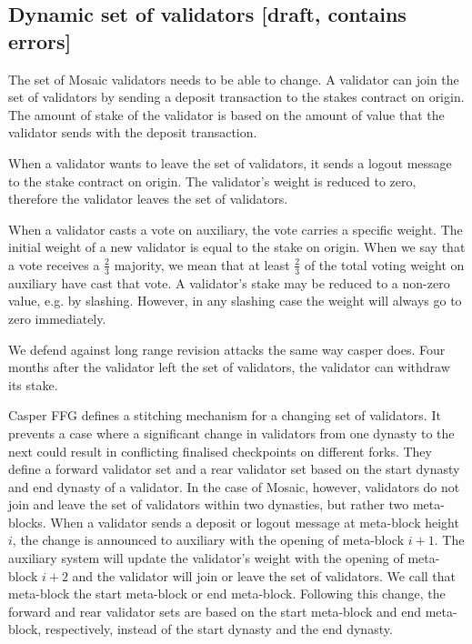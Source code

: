 \documentclass[12pt,a4paper]{article}
\begin{document}
\subsection{Dynamic set of validators [draft, contains errors]}

The set of Mosaic validators needs to be able to change.
A validator can join the set of validators by sending a deposit transaction to the stakes contract on origin.
The amount of stake of the validator is based on the amount of value that the validator sends with the deposit transaction.

When a validator wants to leave the set of validators, it sends a logout message to the stake contract on origin.
The validator's weight is reduced to zero, therefore the validator leaves the set of validators.

When a validator casts a vote on auxiliary, the vote carries a specific weight.
The initial weight of a new validator is equal to the stake on origin.
When we say that a vote receives a $\frac{2}{3}$ majority, we mean that at least $\frac{2}{3}$ of the total voting weight on auxiliary have cast that vote.
A validator's stake may be reduced to a non-zero value, e.g. by slashing.
However, in any slashing case the weight will always go to zero immediately.

We defend against long range revision attacks the same way casper does.
Four months after the validator left the set of validators, the validator can withdraw its stake.

Casper FFG\cite{casperffg} defines a stitching mechanism for a changing set of validators.
It prevents a case where a significant change in validators from one dynasty to the next could result in conflicting finalised checkpoints on different forks.
They define a forward validator set and a rear validator set based on the start dynasty and end dynasty of a validator.
In the case of Mosaic, however, validators do not join and leave the set of validators within two dynasties, but rather two meta-blocks.
When a validator sends a deposit or logout message at meta-block height $i$, the change is announced to auxiliary with the opening of meta-block $i+1$.
The auxiliary system will update the validator's weight with the opening of meta-block $i+2$ and the validator will join or leave the set of validators. We call that meta-block the start meta-block or end meta-block.
Following this change, the forward and rear validator sets are based on the start meta-block and end meta-block, respectively, instead of the start dynasty and the end dynasty.
\end{document}
